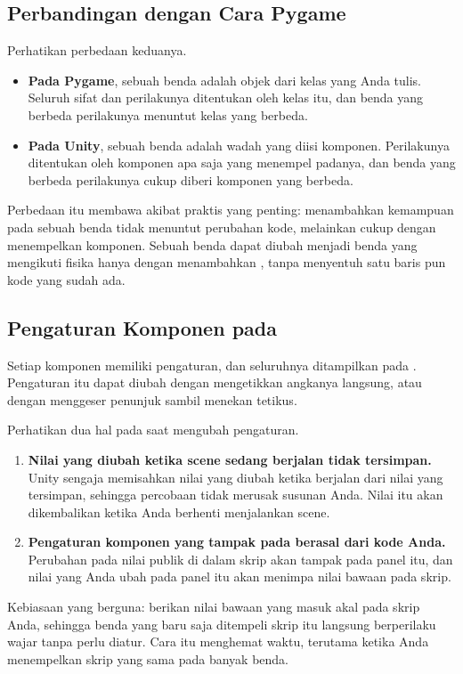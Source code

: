 \subsection{Perbandingan dengan Cara Pygame}

Perhatikan perbedaan keduanya.

\begin{itemize}
  \item \textbf{Pada Pygame}, sebuah benda adalah objek dari kelas yang Anda
        tulis. Seluruh sifat dan perilakunya ditentukan oleh kelas itu, dan
        benda yang berbeda perilakunya menuntut kelas yang berbeda.
  \item \textbf{Pada Unity}, sebuah benda adalah wadah yang diisi komponen.
        Perilakunya ditentukan oleh komponen apa saja yang menempel padanya,
        dan benda yang berbeda perilakunya cukup diberi komponen yang berbeda.
\end{itemize}

Perbedaan itu membawa akibat praktis yang penting: menambahkan kemampuan pada
sebuah benda tidak menuntut perubahan kode, melainkan cukup dengan menempelkan
komponen. Sebuah benda dapat diubah menjadi benda yang mengikuti fisika hanya
dengan menambahkan , tanpa menyentuh satu baris pun kode
yang sudah ada.

\subsection{Pengaturan Komponen pada }

Setiap komponen memiliki pengaturan, dan seluruhnya ditampilkan pada
. Pengaturan itu dapat diubah dengan mengetikkan angkanya
langsung, atau dengan menggeser penunjuk sambil menekan tetikus.

Perhatikan dua hal pada saat mengubah pengaturan.

\begin{enumerate}
  \item \textbf{Nilai yang diubah ketika scene sedang berjalan tidak
        tersimpan.} Unity sengaja memisahkan nilai yang diubah ketika berjalan
        dari nilai yang tersimpan, sehingga percobaan tidak merusak susunan
        Anda. Nilai itu akan dikembalikan ketika Anda berhenti menjalankan
        scene.
  \item \textbf{Pengaturan komponen yang tampak pada 
        berasal dari kode Anda.} Perubahan pada nilai publik di dalam skrip
        akan tampak pada panel itu, dan nilai yang Anda ubah pada panel itu
        akan menimpa nilai bawaan pada skrip.
\end{enumerate}

\begin{tipsbox}
Kebiasaan yang berguna: berikan nilai bawaan yang masuk akal pada skrip Anda,
sehingga benda yang baru saja ditempeli skrip itu langsung berperilaku wajar
tanpa perlu diatur. Cara itu menghemat waktu, terutama ketika Anda menempelkan
skrip yang sama pada banyak benda.
\end{tipsbox}
